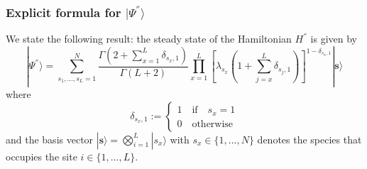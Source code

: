 \documentclass[11pt]{article}
\numberwithin{equation}{section}
\numberwithin{equation}{subsection}
\begin{document}
\subsubsection{Explicit formula for $|\Psi^{''}\rangle$}\label{subsectionSSHsec}
We state the following result: the steady state of the Hamiltonian $H^{''}$ is given by 
\begin{equation}\label{ResulsBasis}
	|\Psi^{''} \rangle=\sum_{s_{1},\ldots,s_{L}=1}^{N}\frac{\Gamma\left(2+\sum_{x=1}^{L}\delta_{s_{x},1}\right)}{\Gamma\left(L+2\right)}\prod_{x=1}^{L}\left[\lambda_{s_{x}}\left(1+\sum_{j=x}^{L}\delta_{s_{j},1}\right)\right]^{1-\delta_{s_{x},1}}|\mathbf{\bm{s}}\rangle
\end{equation}
where 
\begin{equation}
    \delta_{s_{x},1}:=\begin{cases}
        1\quad \text{if}\quad s_{x}=1\\
        0\quad \text{otherwise}
    \end{cases}
\end{equation}
and the basis vector $|\bm{s}\rangle =\bigotimes_{i=1}^{L}|s_{x}\rangle$ with $s_{x}\in\{1,\ldots,N\}$ denotes the species that occupies the site $i\in \{1,\ldots,L\}$.
\end{document}
